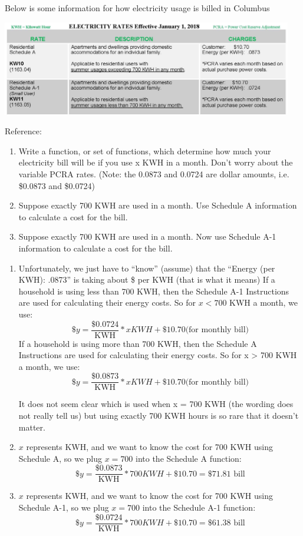 \documentclass{ximera}
\begin{document}
\begin{example}
Below is some information for how electricity usage is billed in Columbus
\begin{image}
\includegraphics[width=5in]{electricity.jpg}
\end{image}
Reference: 
\begin{enumerate}
\item Write a function, or set of functions, which determine how much your electricity bill will be if you use x KWH in a month.  Don't worry about the variable PCRA rates.
(Note: the 0.0873 and 0.0724 are dollar amounts, i.e. \$0.0873 and \$0.0724)
\item Suppose exactly 700 KWH are used in a month.  Use Schedule A information to calculate a cost for the bill.
\item Suppose exactly 700 KWH are used in a month.  Now use Schedule A-1 information to calculate a cost for the bill.
\end{enumerate} 
\begin{explanation}
\begin{enumerate}
\item Unfortunately, we just have to “know” (assume) that the “Energy (per KWH): .0873” is taking about \$ per KWH (that is what it means)
If a household is using less than 700 KWH, then the Schedule A-1 Instructions are used for calculating their energy costs.  So for $x < 700$ KWH a month, we use:
\[
	\$y = \frac{\$0.0724}{\text{KWH}}* x KWH + \$10.70 \text{(for monthly bill)}
\]
If a household is using more than 700 KWH, then the Schedule A Instructions are used for calculating their energy costs.  So for x > 700 KWH a month, we use:
\[
	\$y =  \frac{\$0.0873}{\text{KWH}}* x KWH + \$10.70 \text{(for monthly bill)}
\]

It does not seem clear which is used when x = 700 KWH (the wording does not really tell us) but using exactly 700 KWH hours is so rare that it doesn’t matter.

\item $x$ represents KWH, and we want to know the cost for 700 KWH using Schedule A, so we plug $x = 700$ into the Schedule A function:
\[
\$y =  \frac{\$0.0873}{\text{KWH}}* 700 KWH + \$10.70 = \$71.81 \text{ bill}
\]
\item $x$ represents KWH, and we want to know the cost for 700 KWH using Schedule A-1, so we plug $x = 700$ into the Schedule A-1 function:
\[
\$y =  \frac{\$0.0724}{\text{KWH}}* 700 KWH + \$10.70 = \$61.38 \text{ bill}
\]
\end{enumerate} 
\end{explanation}
\end{example}
\end{document}
